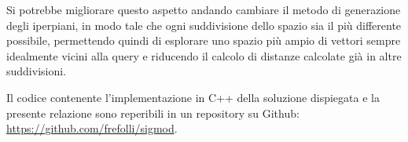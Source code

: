 Si potrebbe migliorare questo aspetto andando cambiare il metodo di generazione 
degli iperpiani, in modo tale che ogni suddivisione dello spazio sia il più differente 
possibile, permettendo quindi di esplorare uno spazio più ampio di vettori 
sempre idealmente vicini alla query e riducendo il calcolo di distanze 
calcolate già in altre suddivisioni. 

Il codice contenente l'implementazione in C++ della soluzione dispiegata e la presente relazione
sono reperibili in un repository su Github: \href{https://github.com/frefolli/sigmod}{https://github.com/frefolli/sigmod}.
